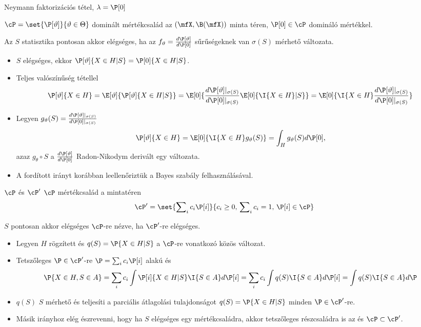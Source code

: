 \documentclass[aspectratio=169,notheorems,9pt,\option]{beamer}
\begin{document}
\begin{frame}{Neymann faktorizációs tétel, $\lambda=\P[0]$}
\begin{theorem}
  $\cP=\set{\P[\theta]}{\theta\in\Theta}$ dominált mértékcsalád az 
  $(\mfX,\B(\mfX))$ minta téren, $\P[0]\in\cP$ domináló mértékkel. 
  
  Az $S$  statisztika pontosan akkor elégséges, ha az 
  $f_\theta=\frac{d\P[\theta]}{d\P[0]}$ 
  sűrűségeknek van $\sigma(S)$ mérhető változata.
\end{theorem}
\begin{itemize}
  \item $S$ elégséges, ekkor $\P[\theta]{X\in H|S}=\P[0]{X\in H|S}$.
  \item Teljes valószínűség tétellel
  \begin{displaymath}
    \P[\theta]{X\in H}
    =\E[\theta]{\P[\theta]{X\in H|S}}
    =\E[0]{\frac{d\P[\theta]|_{\sigma(S)}}{d\P[0]|_{\sigma(S)}}\E[0]{\I{X\in H}|S}}
    =\E[0]{\I{X\in H}\frac{d\P[\theta]|_{\sigma(S)}}{d\P[0]|_{\sigma(S)}}}
  \end{displaymath}
  \item Legyen $g_\theta(S)=\frac{d\P[\theta]|_{\sigma(S)}}{d\P[0]|_{\sigma(S)}}$
  \begin{displaymath}
    \P[\theta]{X\in H}=\E[0]{\I{X\in H}g_\theta(S)}=\int_H g_\theta(S)d\P[0],
  \end{displaymath}
  azaz $g_\theta\circ S$  a $\frac{d\P[\theta]}{d\P[0]}$ Radon-Nikodym derivált egy változata.
  \item A fordított irányt korábban leellenőriztük a Bayes szabály felhasználásával.
\end{itemize}
\end{frame}

\begin{frame}{$\cP$ és $\cP'$}
$\cP$ mértékcsalád a mintatéren
\begin{displaymath}
  \cP'=\set{\sum\nolimits_i c_i\P[i]}{c_i\geq0,\,\sum\nolimits_i c_i=1,\,\P[i]\in\cP}  
\end{displaymath}
\begin{proposition}
  $S$ pontosan akkor elégséges $\cP$-re nézve, ha $\cP'$-re elégséges.
\end{proposition}
\begin{itemize}
  \item Legyen $H$ rögzített és $q(S)=\P{X\in H|S}$ a $\cP$-re vonatkozó közös változat. 
  \item Tetszőleges $\P\in\cP'$-re $\P=\sum_{i } c_i\P[i]$ alakú és 
  \begin{displaymath}
    \P{X\in H, S\in A}
    =\sum_{i} c_i\int \P[i]{X\in H|S}\I{S\in A}d\P[i]
    =\sum_i c_i\int q(S) \I{S\in A}d\P[i]
    =\int q(S)\I{S\in A}d\P
  \end{displaymath} 
  \item $q(S)$ $S$ mérhető és teljesíti a parciális átlagolási tulajdonságot $q(S)=\P{X\in H|S}$
  minden $\P\in\cP'$-re.
  \item Másik irányhoz elég észrevenni, hogy ha $S$ elégséges egy mértékcsaládra, 
  akkor tetszőleges részcsaládra is az és $\cP\subset\cP'$.
\end{itemize}
\end{frame}
\end{document}
